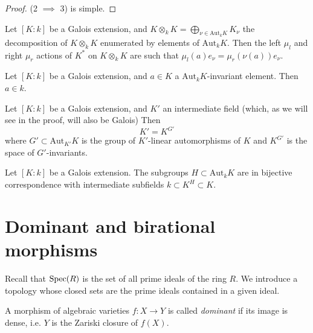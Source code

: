 \begin{proof}
(2 $\implies$ 3) is simple.
\end{proof}

\begin{lemma}
\label{lemma-galois-extension-and-direct-sum}
Let $[K:k]$ be a Galois extension,
and $K\otimes_k K = \bigoplus_{\nu \in
\text{Aut}_k K}K_\nu$
the decomposition of $K \otimes_k K$
enumerated by elements of $\text{Aut}_k K$.
Then the left $\mu_l$ and right $\mu_r$
actions of $K^*$ on
$K\otimes_k K$ are such that
$\mu_l(a)e_\nu = \mu_r(\nu(a))e_\nu$.
\end{lemma}

\begin{lemma}
\label{lemma-gal-invariant}
Let $[K:k]$ be a Galois extension,
and $a \in K$ a $\text{Aut}_k K$-invariant
element.
Then $a \in k$.
\end{lemma}

\begin{lemma}
\label{lemma-galois-and-g-invariants}
Let $[K:k]$ be a Galois extension, and $K'$
an intermediate field
(which, as we will see in the proof, will
also be Galois)
Then
$$
K' = K^{G'}
$$
where $G' \subset \text{Aut}_{K'}K$ is the
group
of $K'$-linear automorphisms of $K$
and $K^{G'}$ is the space of $G'$-invariants.
\end{lemma}

\begin{theorem}
\label{theorem-main-theorem-of-galois-theory}
Let $[K:k]$ be a Galois extension.
The subgroups $H \subset \text{Aut}_k K$ are
in bijective correspondence
with intermediate subfields
$k \subset K^H \subset K$.
\end{theorem}


\section{Dominant
and birational morphisms}
\label{section-dominant-birational-morphisms}

\noindent
Recall that $\mathop{\mathrm{Spec}}(R)$ is the set of all
prime ideals of the ring $R$. We introduce a
topology whose closed sets are the prime
ideals contained in a given ideal.

\begin{definition}
\label{definition-dominant-morphism}
A morphism of algebraic varieties $f:X \to Y$
is called {\it dominant}
if its image is dense,
i.e. $Y$ is the Zariski closure of $f(X)$.
\end{definition}

